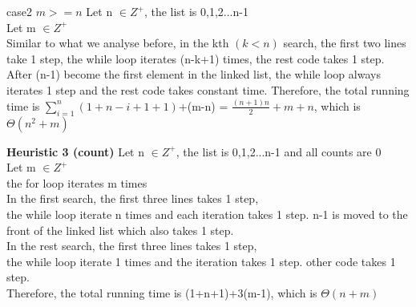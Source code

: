 \documentclass[fontsize=11pt]{article}
\begin{document}
\begin{enumerate}
\begin{enumerate}
            case2 $m>=n$
            Let n $\in Z^+$, the list is 0,1,2...n-1\\
            Let m $\in Z^+$\\
            Similar to what we analyse before, in the kth $(k<n)$ search, the first two lines take 1 step, the while loop iterates (n-k+1) times, the rest code takes 1 step. \\
            After (n-1) become the first element in the linked list, the while loop always iterates 1 step and the rest code takes constant time.
            Therefore, the total running time is $\sum_{i=1}^{n} (1+n-i+1+1)$+(m-n) = $\frac{(n+1)n}{2}+m+n$, which is $\Theta(n^{2}+m)$

            \textbf{Heuristic 3 (count)}
            Let n $\in Z^+$, the list is 0,1,2...n-1 and all counts are 0\\
            Let m $\in Z^+$\\
            the for loop iterates m times\\
            In the first search, the first three lines takes 1 step, \\
            the while loop iterate n times and each iteration takes 1 step.
            n-1 is moved to the front of the linked list which also takes 1 step.\\
            In the rest search, the first three lines takes 1 step, \\
            the while loop iterate 1 times and the iteration takes 1 step.
            other code takes 1 step.\\
            Therefore, the total running time is (1+n+1)+3(m-1), which is $\Theta(n+m)$


        \end{enumerate}


\end{enumerate}
\end{document}

